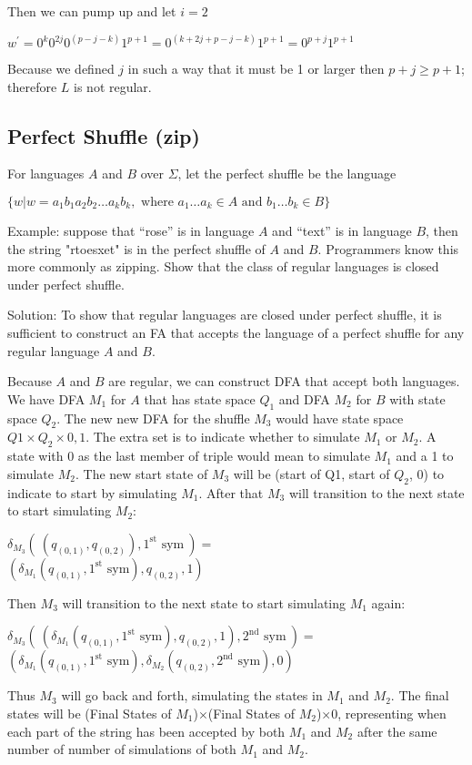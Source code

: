 Then we can pump up and let $i=2$

$w^\prime = 0^k0^{2j}0^{(p-j-k)}1^{p+1}=0^{(k+2j+p-j-k)}1^{p+1}=0^{p+j}1^{p+1}$

Because we defined $j$ in such a way that it must be 1 or larger then
$p+j \geq p+1$; therefore $L$ is not regular.

\subsection{Perfect Shuffle (zip)}
For languages $A$ and $B$ over $\Sigma$, let the perfect shuffle be the
language

$\{w | w = a_1b_1 a_2b_2 \dots a_kb_k, 
\text{ where } a_1\dots a_k \in A \text{ and } b_1\dots b_k \in B\}$

Example: suppose that ``rose'' is in language $A$ and ``text'' is in
language $B$, then the string "rtoesxet" is in the perfect shuffle of
$A$ and $B$. Programmers know this more commonly as zipping. Show that
the class of regular languages is closed under perfect shuffle.

Solution: To show that regular languages are closed under perfect
shuffle, it is sufficient to construct an FA that accepts the language
of a perfect shuffle for any regular language $A$ and $B$.

Because $A$ and $B$ are regular, we can construct DFA that accept both
languages. We have DFA $M_1$ for $A$ that has state space $Q_1$ and DFA
$M_2$ for $B$ with state space $Q_2$. The new new DFA for the shuffle
$M_3$ would have state space $Q1\times Q_2\times {0,1}$. The extra set
is to indicate whether to simulate $M_1$ or $M_2$. A state with 0 as the
last member of triple would mean to simulate $M_1$ and a 1 to simulate
$M_2$. The new start state of $M_3$ will be (start of Q1, start of
$Q_2$, 0) to indicate to start by simulating $M_1$. After that $M_3$
will transition to the next state to start simulating $M_2$:

$\delta_{M_3}(~ ( q_{(0,1)}, q_{(0,2)} ), 1^\text{st} \text{ sym}~) = $\\
$(\delta_{M_1}(q_{(0,1)}, 1^\text{st} \text{ sym}), q_{(0,2)}, 1)$

Then $M_3$ will transition to the next state to start simulating $M_1$ again:

$\delta_{M_3}(~ (\delta_{M_1}(q_{(0,1)}, 1^\text{st} \text{ sym}), q_{(0,2)}, 1), 2^\text{nd} \text{ sym} ~) = $\\
$(\delta_{M_1}(q_{(0,1)}, 1^\text{st} \text{ sym}), \delta_{M_2}(q_{(0,2)}, 2^\text{nd} \text{ sym}), 0)$

Thus $M_3$ will go back and forth, simulating the states in $M_1$ and $M_2$. The final states will be (Final States of $M_1$)$\times$(Final States of $M_2$)$\times$0, representing when each part of the string has been accepted by both $M_1$ and $M_2$ after the same number of number of simulations of both $M_1$ and $M_2$.